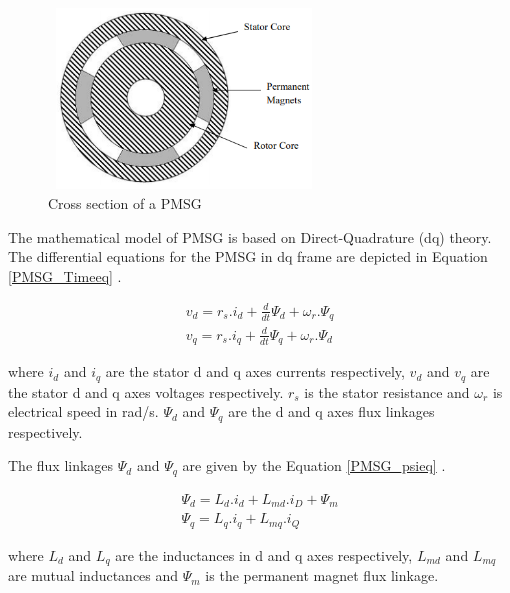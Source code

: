 \begin{figure}[]
\centering
    \includegraphics[height = 4.8cm,width = 7.2cm]{Diagrams/Chapter_2/PMSG.PNG}
    \caption{Cross section of a PMSG \cite{sebastian_transient_1989}}
    \label{fig:PMSG}
\end{figure}

The mathematical model of \gls{PMSG} is based on Direct-Quadrature (\gls{dq}) theory. The differential equations for the \gls{PMSG} in \gls{dq} frame are depicted in Equation \ref{PMSG_Timeeq} \cite{sebastian_transient_1989}.  

\begin{equation}\label{PMSG_Timeeq}
\begin{aligned}
    v_d = r_s . i_d + \frac{d}{dt} \Psi_d +\omega_r . \Psi_q \\
    v_q = r_s . i_q + \frac{d}{dt} \Psi_q +\omega_r . \Psi_d
\end{aligned}
\end{equation}

where $i_d$ and $i_q$ are the stator d and q axes currents respectively, $v_d$ and $v_q$ are the stator d and q axes voltages respectively. $r_s$ is the stator resistance and $\omega_r$ is electrical speed in rad/s. $\Psi_d$ and $\Psi_q$ are the d and q axes flux linkages respectively.

The flux linkages $\Psi_d$ and $\Psi_q$ are given by the Equation \ref{PMSG_psieq} \cite{rtds_tech}.

\begin{equation}\label{PMSG_psieq}
\begin{aligned}
    \Psi_d = L_d . i_d + L_{md} . i_D  + \Psi_m \\
    \Psi_q = L_q . i_q + L_{mq} . i_Q
\end{aligned}
\end{equation}

where $L_d$ and $L_q$ are the inductances in d and q axes respectively, $L_{md}$ and $L_{mq}$ are mutual inductances and $\Psi_m$ is the permanent magnet flux linkage.

